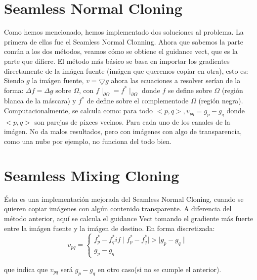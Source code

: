 \documentclass[oneside]{article}
\begin{document}
\begin{multicols}{1}
\section{Seamless Normal Cloning}
Como hemos mencionado, hemos implementado dos soluciones al problema. La primera de ellas fue el Seamless Normal Clonning.
Ahora que sabemos la parte común a los dos métodos, veamos cómo se obtiene el guidance vect, que es la parte que difiere. \newline
El método más básico se basa en importar los gradientes directamente de la imágen fuente (imágen que queremos copiar en otra), esto es:
Siendo $g$ la imágen fuente, $v= \bigtriangledown g $ ahora las ecuaciones a resolver serían de la forma:
$\Delta f=\Delta g$  sobre $\Omega$, con $f\mid_{\partial \Omega}=f^{*}\mid_{\partial\Omega}$ donde $f$ se define sobre $\Omega$ (región blanca de la máscara)
y $f^{*}$ de define sobre el complementode $\Omega$ (región negra). \newline
Computacionalmente, se calcula como: \newline
para todo $<p,q>,v_{pq} =g_{p}-g_{q}$ donde $<p,q>$ son parejas de píxees vecinos. Para cada uno de los canales de la imágen. \newline
No da malos resultados, pero con imágenes con algo de transparencia, como una nube por ejemplo, no funciona del todo bien.

\section{Seamless Mixing Cloning}
Ésta es una implementación mejorada del Seamless Normal Cloning, cuando se quieren copiar imágenes con algún contenido transparente.
A diferencia del método anterior, aquí se calcula el guidance Vect tomando el gradiente más fuerte entre la imágen fuente y la imágen de destino.
En forma discretizada: \newline
\[v_{pq}=\left\{\begin{matrix} f^{*}_{p}-f^{*}_{q} if \mid f^{*}_{p}-f^{*}_{q}\mid > \mid g_{p}-g_{q} \mid \\ g_{p}-g_{q} \end{matrix}\right.\]

que indica que $v_{pq}$ será $g_{p}-g_{q}$ en otro caso(si no se cumple el anterior).

\end{multicols}
\end{document}
